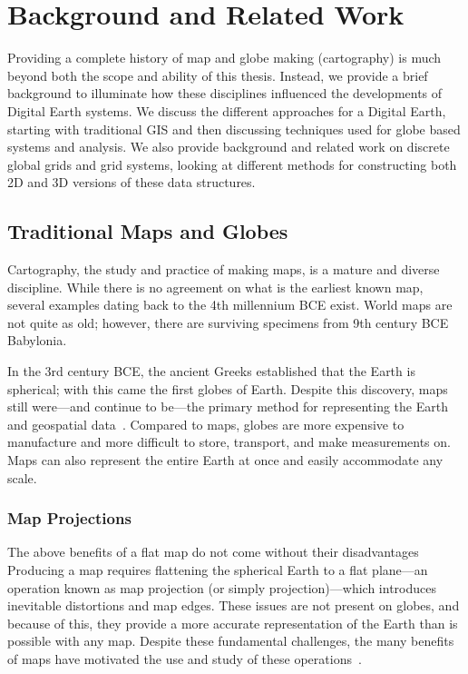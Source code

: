 \chapter{Background and Related Work} \label{chap:background}
Providing a complete history of map and globe making (cartography) is much beyond both the scope and ability of this thesis.
Instead, we provide a brief background to illuminate how these disciplines influenced the developments of Digital Earth systems.
We discuss the different approaches for a Digital Earth, starting with traditional GIS and then discussing techniques used for globe based systems and analysis.
We also provide background and related work on discrete global grids and grid systems, looking at different methods for constructing both 2D and 3D versions of these data structures.


\section{Traditional Maps and Globes}
Cartography, the study and practice of making maps, is a mature and diverse discipline.
While there is no agreement on what is the earliest known map, several examples dating back to the 4th millennium BCE exist.
World maps are not quite as old; however, there are surviving specimens from 9th century BCE Babylonia.


In the 3rd century BCE, the ancient Greeks established that the Earth is spherical; with this came the first globes of Earth.
Despite this discovery, maps still were---and continue to be---the primary method for representing the Earth and geospatial data~\cite{hruby20182000}.
Compared to maps, globes are more expensive to manufacture and more difficult to store, transport, and make measurements on.
Maps can also represent the entire Earth at once and easily accommodate any scale.


\subsection{Map Projections}
The above benefits of a flat map do not come without their disadvantages
Producing a map requires flattening the spherical Earth to a flat plane---an operation known as map projection (or simply projection)---which introduces inevitable distortions and map edges.
These issues are not present on globes, and because of this, they provide a more accurate representation of the Earth than is possible with any map.
Despite these fundamental challenges, the many benefits of maps have motivated the use and study of these operations~\cite{snyder1987map, snyder1997flattening}.


